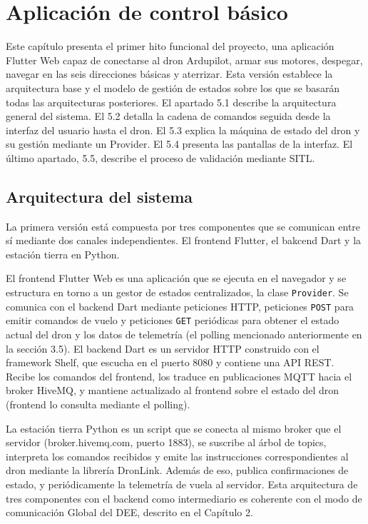 \chapter{Aplicación de control básico}
Este capítulo presenta el primer hito funcional del proyecto, una aplicación Flutter Web capaz de conectarse al dron Ardupilot, armar sus motores, despegar, navegar en las seis direcciones básicas y aterrizar. Esta versión establece la arquitectura base y el modelo de gestión de estados sobre los que se basarán todas las arquitecturas posteriores. El apartado 5.1 describe la arquitectura general del sistema. El 5.2 detalla la cadena de comandos seguida desde la interfaz del usuario hasta el dron. El 5.3 explica la máquina de estado del dron y su gestión mediante un Provider. El 5.4 presenta las pantallas de la interfaz. El último apartado, 5.5, describe el proceso de validación mediante SITL.

\section{Arquitectura del sistema}
La primera versión está compuesta por tres componentes que se comunican entre sí mediante dos canales independientes. El frontend Flutter, el bakcend Dart y la estación tierra en Python.

El frontend Flutter Web es una aplicación que se ejecuta en el navegador y se estructura en torno a un gestor de estados centralizados, la clase \texttt{Provider}. Se comunica con el backend Dart mediante peticiones HTTP, peticiones \texttt{POST} para emitir comandos de vuelo y peticiones \texttt{GET} periódicas para obtener el estado actual del dron y los datos de telemetría (el polling mencionado anteriormente en la sección 3.5).
El backend Dart es un servidor HTTP construido con el framework Shelf, que escucha en el puerto 8080 y contiene una API REST. Recibe los comandos del frontend, los traduce en publicaciones MQTT hacia el broker HiveMQ, y mantiene actualizado al frontend sobre el estado del dron (frontend lo consulta mediante el polling).

La estación tierra Python es un script que se conecta al mismo broker que el servidor (broker.hivemq.com, puerto 1883), se suscribe al árbol de topics, interpreta los comandos recibidos y emite las instrucciones correspondientes al dron mediante la librería DronLink. Además de eso, publica confirmaciones de estado, y periódicamente la telemetría de vuela al servidor.
Esta arquitectura de tres componentes con el backend como intermediario es coherente con el modo de comunicación Global del DEE, descrito en el Capítulo 2. 

